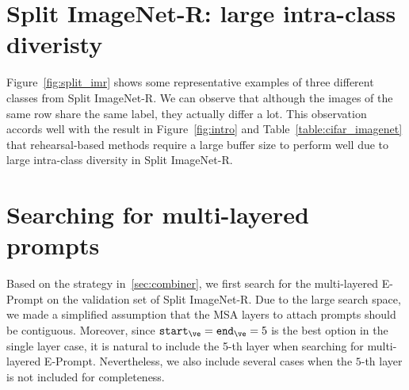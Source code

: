 \documentclass[runningheads]{llncs}
\newcommand{\eprompt}{E-Prompt\xspace}
\def \iep{\texttt{start}_{\ve}}
\def \jep{\texttt{end}_{\ve}}
\begin{document}
\section{Split ImageNet-R: large intra-class diveristy} \label{app:split_imr}
Figure~\ref{fig:split_imr} shows some representative examples of three different classes from Split ImageNet-R. We can observe that although the images of the same row share the same label, they actually differ a lot. This observation accords well with the result in Figure~\ref{fig:intro} and Table~\ref{table:cifar_imagenet} that rehearsal-based methods require a large buffer size to perform well due to large intra-class diversity in Split ImageNet-R.



\section{Searching for multi-layered prompts} \label{app:multi_layer}
Based on the strategy in~\ref{sec:combiner}, we first search for the multi-layered \eprompt on the validation set of Split ImageNet-R. Due to the large search space, we made a simplified assumption that the MSA layers to attach prompts should be contiguous. Moreover, since $\iep = \jep = 5$ is the best option in the single layer case, it is natural to include the 5-th layer when searching for multi-layered \eprompt. Nevertheless, we also include several cases when the $5$-th layer is not included for completeness.
\end{document}
